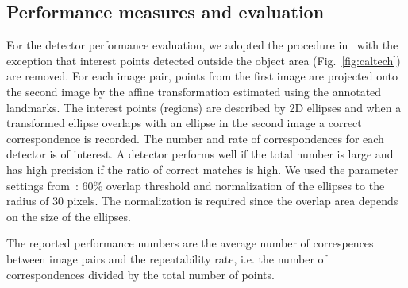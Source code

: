\documentclass[review]{elsarticle}
\begin{document}
%
\subsection{Performance measures and evaluation}
%
For the detector performance evaluation, we adopted the procedure in~\cite{MikTuySch:2005}
with the exception that
interest points detected outside the object area (Fig.~\ref{fig:caltech})
are removed.
%
For each image pair, points from the first image are projected onto the
second image by the
affine transformation estimated using the annotated landmarks.
The interest points (regions) are described by 2D ellipses and when a transformed
ellipse overlaps with an ellipse in the second image a correct correspondence
is recorded.
The number and rate of correspondences for each detector is of interest. A detector performs well
if the total number is large and has high precision if the ratio of correct matches is high.
We used the parameter settings
from~\cite{MikTuySch:2005}: 60\% overlap threshold and normalization of the ellipses to
the radius of 30 pixels. The normalization is required since the overlap area depends
on the size of the ellipses. %

The reported performance numbers are the average number of correspences between
image pairs and the repeatability rate, i.e. the number of correspondences divided
by the total number of points.
\end{document}
